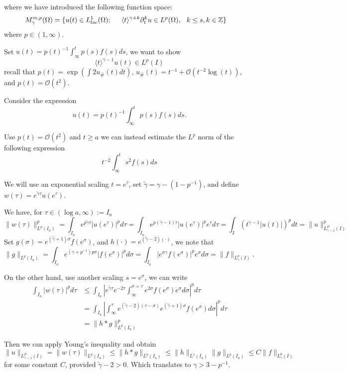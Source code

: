 \documentclass[letterpaper,11pt]{article}
\newcommand{\rmO}{\mathcal{O}}
\numberwithin{equation}{section}
\theoremstyle{plain}
\begin{document}
where we have introduced the following function space:
\begin{align*}
M^{m,p}_{\gamma}(\Omega)=\{ &u(t) \in L^1_{loc}(\Omega); \hspace{0.2in} \langle t \rangle^{\gamma+ k} \partial^k_t u \in L^p(\Omega), \hspace{0.1in} k \le s, k \in \mathbb{Z}
\}
\end{align*}
where $p\in (1,\infty)$.

Set $u(t) = p(t)^{-1}\int_\infty^t p(s)f(s)ds$, we want to show
\[
\langle t \rangle^{\gamma-1}u(t) \in L^p(I)
\]
recall that $p(t) = \exp(\int 2u_\#(t)dt)$, $u_\#(t) = t^{-1}+\rmO(t^{-2}\log(t))$, and $p(t) = \rmO(t^2).$

Consider the expression
\[
u(t) = p(t)^{-1}\int_\infty^t p(s)f(s)ds.
\]

Use $p(t)=\rmO(t^2)$ and $t\ge a$ we can instead estimate the $L^p$ norm of the following expression
\[
t^{-2}\int_{\infty}^t s^2 f(s)ds
\]

We will use an exponential scaling $t = e^\tau$, set $\tilde{\gamma} = \gamma-(1-p^{-1})$, and define $w(\tau) = e^{\tilde{\gamma}\tau}u(e^{\tau})$.

We have, for $\tau \in (\log a, \infty):=I_a$
\[
\| w(\tau)\|_{L^p(I_a)}^p = \int_{I_a} e^{p\tilde{\gamma}\tau}|u(e^\tau)|^pd\tau = \int_{I_a} e^{p(\gamma-1)\tau}|u(e^\tau)|^p e^{\tau}d\tau = \int_I (t^{\gamma-1}|u(t)|)^p dt = \|u\|_{L^P_{\gamma-1}(I)}^p
\]
Set $g(\sigma) = e^{(\tilde{\gamma}+1)\sigma}f(e^\sigma)$, and $h(\cdot) = e^{(\tilde{\gamma}-2)(\cdot)}$, we note that
\[
\| g\|_{L^p(I_a)} = \int_{I_a} e^{(\gamma+p^{-1})p\sigma} |f(e^\sigma) |^p d\sigma = \int_{I_a} |e^{\sigma \gamma}f(e^\sigma)|^p e^\sigma d\sigma = \| f\|_{L^p_\gamma(I)}.
\]


On the other hand, use another scaling $s = e^\sigma$, we can write
\begin{align*}
\int_{I_a} |w(\tau)|^p d\tau &\le \int_{I_a} \left|e^{\tilde{\gamma}\tau }e^{-2\tau}\int_\infty^{\sigma=\tau} e^{2\sigma}f(e^\sigma)e^{\sigma}d\sigma\right|^p d\tau  \\
&=\int_{I_a} \left| \int_\infty^\tau e^{(\tilde{\gamma}-2)(\tau-\sigma)}e^{(\tilde{\gamma}+1)\sigma}f(e^\sigma)d\sigma \right|^p d\tau\\
& = \| h \ast g \|^p_{L^p(I_a)}
\end{align*}

Then we can apply Young's inequality and obtain
\[
 \|u\|_{L^P_{\gamma-1}(I)} =\| w(\tau)\|_{L^p(I_a)}\le \| h \ast g \|_{L^p(I_a)} \le \|h\|_{L^1(I_a)} \|g\|_{L^p(I_a)} \le C \|f\|_{L^p_{\gamma}(I)}
\]
for some constant $C$, provided $\tilde{\gamma}-2>0$. Which translates to $\gamma > 3-p^{-1}$.
\end{document}

